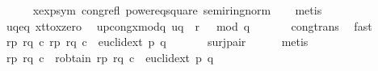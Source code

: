 \begin{isabellebody}
\ \ \ \ \isamarkupfalse%
\ x{\isacharunderscore}{\kern0pt}exp{\isacharunderscore}{\kern0pt}sym\ cong{\isacharunderscore}{\kern0pt}refl\ power{}{\isacharunderscore}{\kern0pt}eq{\isacharunderscore}{\kern0pt}square\ semiring{\isacharunderscore}{\kern0pt}norm{\isacharparenleft}{\kern0pt}{}{}{}{\isacharparenright}{\kern0pt}\isanewline
\ \ \isamarkupfalse%
\ {\isacharparenleft}{\kern0pt}metis{\isacharparenright}{\kern0pt}\isanewline
\isanewline
\ \ \isamarkupfalse%
\ uq{\isacharunderscore}{\kern0pt}eq\ x{\isacharunderscore}{\kern0pt}t{\isacharunderscore}{\kern0pt}to{\isacharunderscore}{\kern0pt}x{\isacharunderscore}{\kern0pt}zero\ \isamarkupfalse%
\ up{\isacharunderscore}{\kern0pt}cong{\isacharunderscore}{\kern0pt}x{\isacharunderscore}{\kern0pt}mod{\isacharunderscore}{\kern0pt}q{\isacharcolon}{\kern0pt}\ {\isachardoublequoteopen}{\isacharbrackleft}{\kern0pt}{\isacharquery}{\kern0pt}uq\ {\isacharequal}{\kern0pt}\ r\ {\isacharcircum}{\kern0pt}\ {}{\isacharbrackright}{\kern0pt}\ {\isacharparenleft}{\kern0pt}mod\ q{\isacharparenright}{\kern0pt}{\isachardoublequoteclose}\ \isanewline
\ \ \ \ \isamarkupfalse%
\ cong{\isacharunderscore}{\kern0pt}trans\ \isamarkupfalse%
\ fast\isanewline
\isanewline
\isanewline
\isanewline
\ \ \isamarkupfalse%
\ {\isachardoublequoteopen}{\isasymexists}r{\isacharunderscore}{\kern0pt}p\ r{\isacharunderscore}{\kern0pt}q\ c{\isachardot}{\kern0pt}\ {\isacharparenleft}{\kern0pt}{\isacharparenleft}{\kern0pt}{\isacharparenleft}{\kern0pt}r{\isacharunderscore}{\kern0pt}p{\isacharcomma}{\kern0pt}\ r{\isacharunderscore}{\kern0pt}q{\isacharparenright}{\kern0pt}{\isacharcomma}{\kern0pt}\ c{\isacharparenright}{\kern0pt}\ {\isacharequal}{\kern0pt}\ euclid{\isacharunderscore}{\kern0pt}ext\ p\ q{\isacharparenright}{\kern0pt}{\isachardoublequoteclose}\ \isanewline
\ \ \ \ \isamarkupfalse%
\ surj{\isacharunderscore}{\kern0pt}pair\isanewline
\ \ \ \ \isamarkupfalse%
\ {\isacharparenleft}{\kern0pt}metis{\isacharparenright}{\kern0pt}\isanewline
\ \ \isamarkupfalse%
\ \isamarkupfalse%
\ r{\isacharunderscore}{\kern0pt}p\ r{\isacharunderscore}{\kern0pt}q\ c\ \ r{\isacharunderscore}{\kern0pt}obtain{\isacharcolon}{\kern0pt}\ {\isachardoublequoteopen}{\isacharparenleft}{\kern0pt}{\isacharparenleft}{\kern0pt}{\isacharparenleft}{\kern0pt}r{\isacharunderscore}{\kern0pt}p{\isacharcomma}{\kern0pt}\ r{\isacharunderscore}{\kern0pt}q{\isacharparenright}{\kern0pt}{\isacharcomma}{\kern0pt}\ c{\isacharparenright}{\kern0pt}\ {\isacharequal}{\kern0pt}\ euclid{\isacharunderscore}{\kern0pt}ext\ p\ q{\isacharparenright}{\kern0pt}{\isachardoublequoteclose}\ \isamarkupfalse%

\end{isabellebody}

